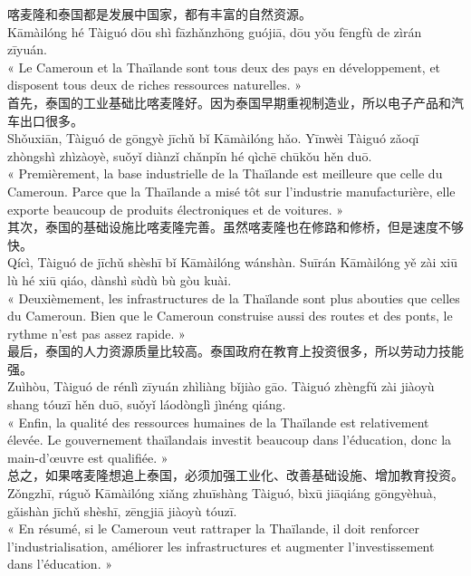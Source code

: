 \documentclass[11pt]{article}
\begin{document}
\begin{textebox}
喀麦隆和泰国都是发展中国家，都有丰富的自然资源。\\
Kāmàilóng hé Tàiguó dōu shì fāzhǎnzhōng guójiā, dōu yǒu fēngfù de zìrán zīyuán.\\
« Le Cameroun et la Thaïlande sont tous deux des pays en développement, et disposent tous deux de riches ressources naturelles. »\\
首先，泰国的工业基础比喀麦隆好。因为泰国早期重视制造业，所以电子产品和汽车出口很多。\\
Shǒuxiān, Tàiguó de gōngyè jīchǔ bǐ Kāmàilóng hǎo. Yīnwèi Tàiguó zǎoqī zhòngshì zhìzàoyè, suǒyǐ diànzǐ chǎnpǐn hé qìchē chūkǒu hěn duō.\\
« Premièrement, la base industrielle de la Thaïlande est meilleure que celle du Cameroun. Parce que la Thaïlande a misé tôt sur l'industrie manufacturière, elle exporte beaucoup de produits électroniques et de voitures. »\\
其次，泰国的基础设施比喀麦隆完善。虽然喀麦隆也在修路和修桥，但是速度不够快。\\
Qícì, Tàiguó de jīchǔ shèshī bǐ Kāmàilóng wánshàn. Suīrán Kāmàilóng yě zài xiū lù hé xiū qiáo, dànshì sùdù bù gòu kuài.\\
« Deuxièmement, les infrastructures de la Thaïlande sont plus abouties que celles du Cameroun. Bien que le Cameroun construise aussi des routes et des ponts, le rythme n'est pas assez rapide. »\\
最后，泰国的人力资源质量比较高。泰国政府在教育上投资很多，所以劳动力技能强。\\
Zuìhòu, Tàiguó de rénlì zīyuán zhìliàng bǐjiào gāo. Tàiguó zhèngfǔ zài jiàoyù shang tóuzī hěn duō, suǒyǐ láodònglì jìnéng qiáng.\\
« Enfin, la qualité des ressources humaines de la Thaïlande est relativement élevée. Le gouvernement thaïlandais investit beaucoup dans l'éducation, donc la main-d'œuvre est qualifiée. »\\
总之，如果喀麦隆想追上泰国，必须加强工业化、改善基础设施、增加教育投资。\\
Zǒngzhī, rúguǒ Kāmàilóng xiǎng zhuīshàng Tàiguó, bìxū jiāqiáng gōngyèhuà, gǎishàn jīchǔ shèshī, zēngjiā jiàoyù tóuzī.\\
« En résumé, si le Cameroun veut rattraper la Thaïlande, il doit renforcer l'industrialisation, améliorer les infrastructures et augmenter l'investissement dans l'éducation. »
\end{textebox}
\end{document}
